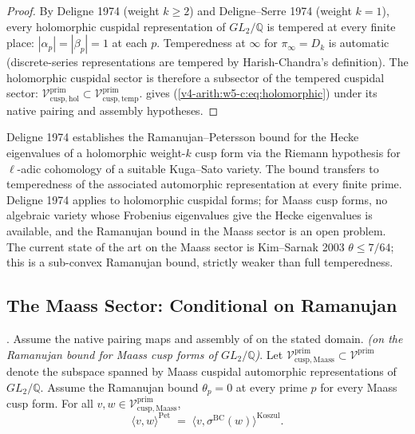 \begin{proof}
By Deligne 1974 (weight \(k\geq 2\)) and Deligne--Serre 1974
(weight \(k=1\)), every holomorphic cuspidal representation of
\(GL_{2}/\mathbb{Q}\) is tempered at every finite place:
\(|\alpha_{p}|=|\beta_{p}|=1\) at each \(p\). Temperedness at \(\infty\)
for \(\pi_{\infty}=D_{k}\) is automatic (discrete-series
representations are tempered by Harish-Chandra's definition).
The holomorphic cuspidal sector is therefore a subsector of the
tempered cuspidal sector:
\(\mathcal{V}^{\mathrm{prim}}_{\mathrm{cusp,hol}}\subset\mathcal{V}^{\mathrm{prim}}_{\mathrm{cusp,temp}}\).
 gives
(\ref{v4-arith:w5-c:eq:holomorphic}) under its native pairing
and assembly hypotheses.
\end{proof}

\begin{remark}
\label{v4-arith:w5-c:rem:deligne}
Deligne 1974 establishes the Ramanujan--Petersson bound for the
Hecke eigenvalues of a holomorphic weight-\(k\) cusp form via the
Riemann hypothesis for \(\ell\)-adic cohomology of a suitable
Kuga--Sato variety. The bound transfers to temperedness of the
associated automorphic representation at every finite prime.
Deligne 1974 applies to holomorphic cuspidal forms; for Maass cusp
forms, no algebraic variety whose Frobenius eigenvalues give the
Hecke eigenvalues is available, and the Ramanujan bound in the Maass
sector is an open problem.
The current state of the art on the Maass sector is Kim--Sarnak
2003 \(\theta\leq 7/64\); this is a sub-convex Ramanujan bound, strictly
weaker than full temperedness.
\end{remark}

\subsection{The Maass Sector: Conditional on Ramanujan}
\label{v4-arith:w5-c:non-tempered:maass}

\begin{theorem}
\label{v4-arith:w5-c:thm:maass-cuspidal}
\ClaimStatusProvedHereConditional. Assume the native pairing maps and assembly of  on the stated domain.  \emph{(on the Ramanujan bound for Maass cusp
forms of \(GL_{2}/\mathbb{Q}\))}. Let
\(\mathcal{V}^{\mathrm{prim}}_{\mathrm{cusp,Maass}}\subset\mathcal{V}^{\mathrm{prim}}\)
denote the subspace spanned by Maass cuspidal automorphic
representations of \(GL_{2}/\mathbb{Q}\). Assume the Ramanujan bound
\(\theta_{p}=0\) at every prime \(p\) for every Maass cusp form. For
all \(v,w\in\mathcal{V}^{\mathrm{prim}}_{\mathrm{cusp,Maass}}\),
\begin{equation}
\label{v4-arith:w5-c:eq:maass}
\langle v,w\rangle^{\mathrm{Pet}}
\;=\;\langle v,\sigma^{\mathrm{BC}}(w)\rangle^{\mathrm{Koszul}}.
\end{equation}
\end{theorem}


